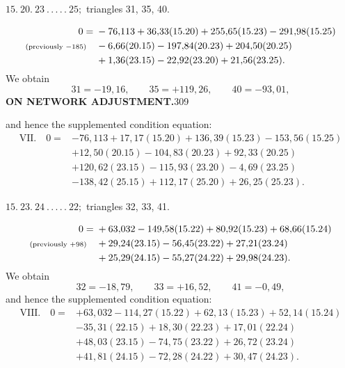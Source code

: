 \par\bigskip
\begin{center}
$15.\ 20.\ 23\ .\,.\,.\,.\,.\ 25;$ triangles 31, 35, 40.
\end{center}
\[
\begin{aligned}
0={}&-76{,}113+36{,}33(15.20)+255{,}65(15.23)-291{,}98(15.25)\\
\text{\scriptsize(previously $-185$)}\quad&-6{,}66(20.15)-197{,}84(20.23)+204{,}50(20.25)\\
&+1{,}36(23.15)-22{,}92(23.20)+21{,}56(23.25).
\end{aligned}
\]
We obtain
\[
31=-19{,}16,\qquad35=+119{,}26,\qquad40=-93{,}01,
\]
\newpage
\noindent\textbf{ON NETWORK ADJUSTMENT.}\hfill309\par\medskip
\noindent and hence the supplemented condition equation:
\[
\begin{aligned}
\mathrm{VII.}\quad0={}&-76{,}113+17{,}17(15.20)+136{,}39(15.23)-153{,}56(15.25)\\
&+12{,}50(20.15)-104{,}83(20.23)+92{,}33(20.25)\\
&+120{,}62(23.15)-115{,}93(23.20)-4{,}69(23.25)\\
&-138{,}42(25.15)+112{,}17(25.20)+26{,}25(25.23).
\end{aligned}
\]

\par\bigskip
\begin{center}
$15.\ 23.\ 24\ .\,.\,.\,.\,.\ 22;$ triangles 32, 33, 41.
\end{center}
\[
\begin{aligned}
0={}&+63{,}032-149{,}58(15.22)+80{,}92(15.23)+68{,}66(15.24)\\
\text{\scriptsize(previously $+98$)}\quad&+29{,}24(23.15)-56{,}45(23.22)+27{,}21(23.24)\\
&+25{,}29(24.15)-55{,}27(24.22)+29{,}98(24.23).
\end{aligned}
\]
We obtain
\[
32=-18{,}79,\qquad33=+16{,}52,\qquad41=-0{,}49,
\]
and hence the supplemented condition equation:
\[
\begin{aligned}
\mathrm{VIII.}\quad0={}&+63{,}032-114{,}27(15.22)+62{,}13(15.23)+52{,}14(15.24)\\
&-35{,}31(22.15)+18{,}30(22.23)+17{,}01(22.24)\\
&+48{,}03(23.15)-74{,}75(23.22)+26{,}72(23.24)\\
&+41{,}81(24.15)-72{,}28(24.22)+30{,}47(24.23).
\end{aligned}
\]

